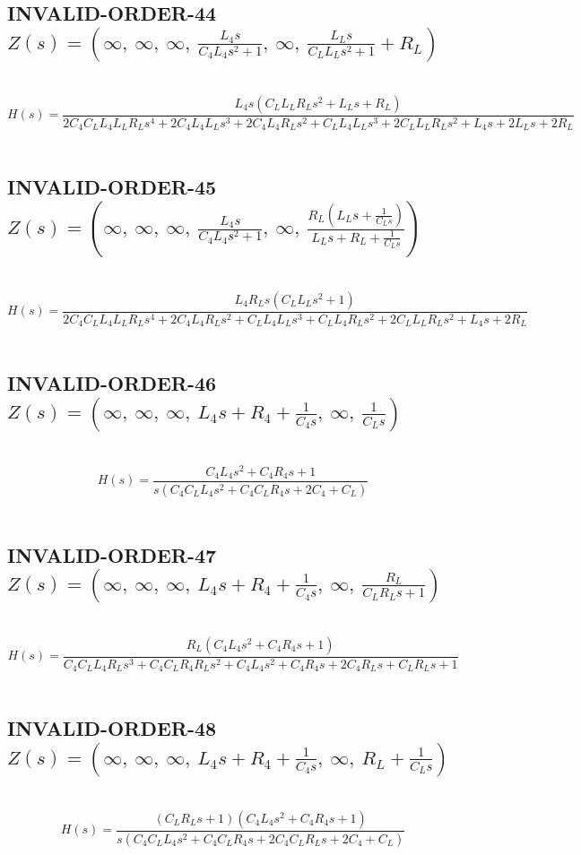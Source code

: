 \documentclass{article}
\begin{document}
\subsection{INVALID-ORDER-44 $Z(s) = \left( \infty, \  \infty, \  \infty, \  \frac{L_{4} s}{C_{4} L_{4} s^{2} + 1}, \  \infty, \  \frac{L_{L} s}{C_{L} L_{L} s^{2} + 1} + R_{L}\right)$ } \ 
\textbf{\[H(s) = \frac{L_{4} s \left(C_{L} L_{L} R_{L} s^{2} + L_{L} s + R_{L}\right)}{2 C_{4} C_{L} L_{4} L_{L} R_{L} s^{4} + 2 C_{4} L_{4} L_{L} s^{3} + 2 C_{4} L_{4} R_{L} s^{2} + C_{L} L_{4} L_{L} s^{3} + 2 C_{L} L_{L} R_{L} s^{2} + L_{4} s + 2 L_{L} s + 2 R_{L}}\] } \ 
\subsection{INVALID-ORDER-45 $Z(s) = \left( \infty, \  \infty, \  \infty, \  \frac{L_{4} s}{C_{4} L_{4} s^{2} + 1}, \  \infty, \  \frac{R_{L} \left(L_{L} s + \frac{1}{C_{L} s}\right)}{L_{L} s + R_{L} + \frac{1}{C_{L} s}}\right)$ } \ 
\textbf{\[H(s) = \frac{L_{4} R_{L} s \left(C_{L} L_{L} s^{2} + 1\right)}{2 C_{4} C_{L} L_{4} L_{L} R_{L} s^{4} + 2 C_{4} L_{4} R_{L} s^{2} + C_{L} L_{4} L_{L} s^{3} + C_{L} L_{4} R_{L} s^{2} + 2 C_{L} L_{L} R_{L} s^{2} + L_{4} s + 2 R_{L}}\] } \ 
\subsection{INVALID-ORDER-46 $Z(s) = \left( \infty, \  \infty, \  \infty, \  L_{4} s + R_{4} + \frac{1}{C_{4} s}, \  \infty, \  \frac{1}{C_{L} s}\right)$ } \ 
\textbf{\[H(s) = \frac{C_{4} L_{4} s^{2} + C_{4} R_{4} s + 1}{s \left(C_{4} C_{L} L_{4} s^{2} + C_{4} C_{L} R_{4} s + 2 C_{4} + C_{L}\right)}\] } \ 
\subsection{INVALID-ORDER-47 $Z(s) = \left( \infty, \  \infty, \  \infty, \  L_{4} s + R_{4} + \frac{1}{C_{4} s}, \  \infty, \  \frac{R_{L}}{C_{L} R_{L} s + 1}\right)$ } \ 
\textbf{\[H(s) = \frac{R_{L} \left(C_{4} L_{4} s^{2} + C_{4} R_{4} s + 1\right)}{C_{4} C_{L} L_{4} R_{L} s^{3} + C_{4} C_{L} R_{4} R_{L} s^{2} + C_{4} L_{4} s^{2} + C_{4} R_{4} s + 2 C_{4} R_{L} s + C_{L} R_{L} s + 1}\] } \ 
\subsection{INVALID-ORDER-48 $Z(s) = \left( \infty, \  \infty, \  \infty, \  L_{4} s + R_{4} + \frac{1}{C_{4} s}, \  \infty, \  R_{L} + \frac{1}{C_{L} s}\right)$ } \ 
\textbf{\[H(s) = \frac{\left(C_{L} R_{L} s + 1\right) \left(C_{4} L_{4} s^{2} + C_{4} R_{4} s + 1\right)}{s \left(C_{4} C_{L} L_{4} s^{2} + C_{4} C_{L} R_{4} s + 2 C_{4} C_{L} R_{L} s + 2 C_{4} + C_{L}\right)}\] } \ 
\end{document}

